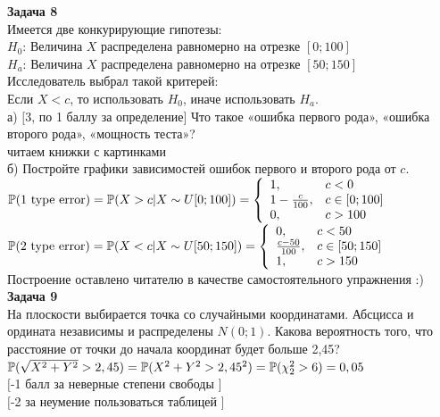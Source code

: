 \documentclass[12pt, a4paper]{article}\usepackage[]{graphicx}\usepackage[]{color}
\begin{document}
	{\bf Задача 8} \\
	Имеется две конкурирующие гипотезы: \\
	$H_{0}$: Величина $X$ распределена равномерно на отрезке $[0;100]$ \\
	$H_{a}$: Величина $X$ распределена равномерно на отрезке $[50;150]$ \\
	Исследователь выбрал такой критерей: \\
	Если $X<c$, то использовать $H_{0}$, иначе использовать $H_{a}$. \\
	а) $[$3, по 1 баллу за определение$]$ Что такое «ошибка первого
	рода», «ошибка второго рода»,
	«мощность теста»? \\
	читаем книжки с картинками \\
	б) Постройте графики зависимостей ошибок первого и второго рода от
	$c$. \\
	$\P(\text{1 type error})=\P(X>c|X\sim U[0;100])= \left\{
	\begin{array}{ll}
	1, & c<0 \\
	1-\frac{c}{100}, & c \in [0;100] \\
	0, & c>100 \\
	\end{array}
	\right.$ \\
	$\P(\text{2 type error})=\P(X<c|X\sim U[50;150])= \left\{
	\begin{array}{ll}
	0, & c<50 \\
	\frac{c-50}{100}, & c \in [50;150] \\
	1, & c>150 \\
	\end{array}
	\right.$ \\
	Построение оставлено читателю в качестве самостоятельного
	упражнения :) \\

	{\bf Задача 9} \\
	На плоскости выбирается точка со случайными координатами. Абсцисса
	и ордината независимы и распределены $N(0;1)$. Какова вероятность
	того, что расстояние от точки до начала координат будет больше
	2,45? \\
	$\P(\sqrt{X^{2}+Y^{2}}>2,45)=\P(X^{2}+Y^{2}>2,45^{2})=\P(\chi_{2}^{2}>6)=0,05$
	\\
	$[$-1 балл за неверные степени свободы $]$ \\
	$[$-2 за неумение пользоваться таблицей $]$ \\
\end{document}
